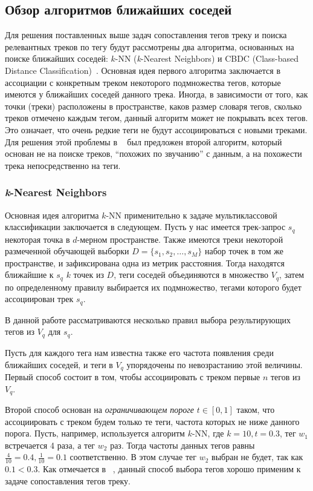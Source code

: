\subsection{Обзор алгоритмов ближайших соседей}

Для решения поставленных выше задач сопоставления тегов треку и поиска релевантных треков по тегу будут рассмотрены два алгоритма, основанных на поиске ближайших соседей: 
$k$-NN (\emph{k}-Nearest Neighbors) и CBDC (Class-based Distance Classification)~\cite{msordo_thesis, knn, trohidis_knn}. 
Основная идея первого алгоритма заключается в ассоциации с конкретным треком некоторого подмножества тегов, 
которые имеются у ближайших соседей данного трека. Иногда, в зависимости от того, как точки (треки) расположены в пространстве, каков размер словаря тегов, сколько треков отмечено
каждым тегом, данный алгоритм может не покрывать всех тегов. Это означает, что очень редкие теги не будут ассоциироваться с новыми треками. Для решения этой проблемы 
в ~\cite{msordo_thesis} был предложен второй алгоритм, который основан не на поиске треков, ``похожих по звучанию'' с данным, а на похожести трека непосредственно на теги.

\subsubsection{\emph{k}-Nearest Neighbors}

Основная идея алгоритма $k$-NN применительно к задаче мультиклассовой классификации заключается в следующем. Пусть у нас имеется трек-запрос $s_q$ \ld некоторая точка в $d$-мерном пространстве.
Также имеются треки некоторой размеченной обучающей выборки $ D = \{s_1, s_2, \ldots, s_M \}$ \ld набор точек в том же пространстве, и зафиксирована одна из метрик расстояния. 
Тогда находятся ближайшие к $s_q$ $k$ точек из $D$, теги соседей объединяются в множество $V_q$, затем по определенному правилу выбирается их подмножество, тегами которого будет ассоциирован трек $s_q$.

В данной работе рассматриваются несколько правил выбора результирующих тегов из $V_q$ для $s_q$. 

Пусть для каждого тега нам известна также его частота появления среди ближайших соседей, и теги
в $V_q$ упорядочены по невозрастанию этой величины. Первый способ состоит в том, чтобы ассоциировать с треком первые $n$ тегов из $V_q$.

Второй способ основан на \emph{ограничивающем пороге} $t \in [0, 1]$ таком, что ассоциировать с треком будем только те теги, частота которых не ниже данного порога.
Пусть, например, используется алгоритм $k$-NN, где $k = 10, t = 0.3$, тег $w_1$ встречается 4 раза, а тег $w_2$  раз. 
Тогда частоты данных тегов равны $\frac{4}{10} = 0.4, \frac{1}{10} = 0.1$ соответственно. В этом случае тег $w_2$ выбран не будет, так как $0.1 < 0.3$.
Как отмечается в ~\cite{msordo_thesis}, данный способ выбора тегов хорошо применим к задаче сопоставления тегов треку.


